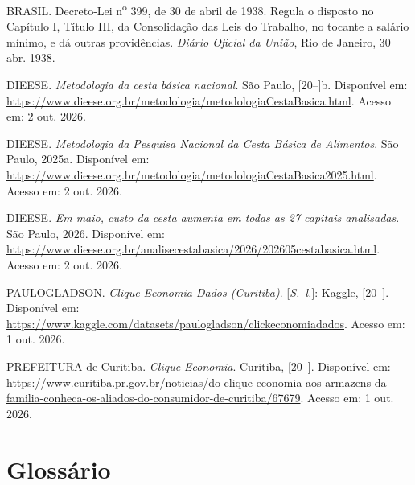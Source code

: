 \documentclass[11pt,a4paper]{article}
\begin{document}
\begin{singlespace}
\setlength{\parindent}{0pt}
\setlength{\parskip}{12pt}

BRASIL. Decreto-Lei n\textsuperscript{o} 399, de 30 de abril de 1938. Regula o disposto no Capítulo I, Título III, da Consolidação das Leis do Trabalho, no tocante a salário mínimo, e dá outras providências. \textit{Diário Oficial da União}, Rio de Janeiro, 30 abr. 1938.

DIEESE. \textit{Metodologia da cesta básica nacional}. São Paulo, [20--]b. Disponível em: \url{https://www.dieese.org.br/metodologia/metodologiaCestaBasica.html}. Acesso em: 2 out. 2026.

DIEESE. \textit{Metodologia da Pesquisa Nacional da Cesta Básica de Alimentos}. São Paulo, 2025a. Disponível em: \url{https://www.dieese.org.br/metodologia/metodologiaCestaBasica2025.html}. Acesso em: 2 out. 2026.

DIEESE. \textit{Em maio, custo da cesta aumenta em todas as 27 capitais analisadas}. São Paulo, 2026. Disponível em: \url{https://www.dieese.org.br/analisecestabasica/2026/202605cestabasica.html}. Acesso em: 2 out. 2026.

PAULOGLADSON. \textit{Clique Economia Dados (Curitiba)}. [\textit{S.~l.}]: Kaggle, [20--]. Disponível em: \url{https://www.kaggle.com/datasets/paulogladson/clickeconomiadados}. Acesso em: 1 out. 2026.

PREFEITURA de Curitiba. \textit{Clique Economia}. Curitiba, [20--]. Disponível em: \url{https://www.curitiba.pr.gov.br/noticias/do-clique-economia-aos-armazens-da-familia-conheca-os-aliados-do-consumidor-de-curitiba/67679}. Acesso em: 1 out. 2026.
\end{singlespace}

\section*{Glossário}
\end{document}
